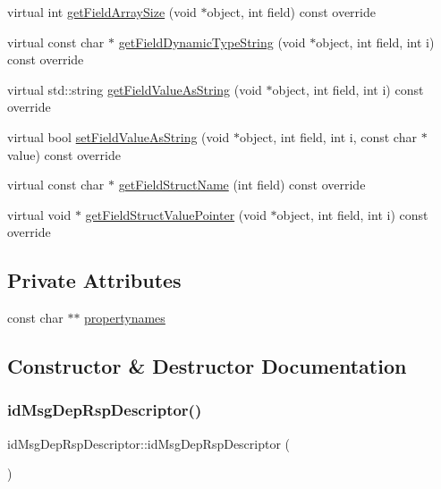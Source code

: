 \begin{DoxyCompactItemize}
virtual int \hyperlink{classidMsgDepRspDescriptor_a47159497c46236c093f395def9ea2601}{get\+Field\+Array\+Size} (void $\ast$object, int field) const override
\item 
virtual const char $\ast$ \hyperlink{classidMsgDepRspDescriptor_af4fdd8255c6294f4c68d7a8ce3cec648}{get\+Field\+Dynamic\+Type\+String} (void $\ast$object, int field, int i) const override
\item 
virtual std\+::string \hyperlink{classidMsgDepRspDescriptor_af28908b0998ae5028ce4439705a56bea}{get\+Field\+Value\+As\+String} (void $\ast$object, int field, int i) const override
\item 
virtual bool \hyperlink{classidMsgDepRspDescriptor_a3b2b332f7e3426e7b6464a973de48013}{set\+Field\+Value\+As\+String} (void $\ast$object, int field, int i, const char $\ast$value) const override
\item 
virtual const char $\ast$ \hyperlink{classidMsgDepRspDescriptor_a2c04a28f7d859199945889c5c1f1525f}{get\+Field\+Struct\+Name} (int field) const override
\item 
virtual void $\ast$ \hyperlink{classidMsgDepRspDescriptor_a1c3f7a29a3bd609bcb9da8317720f673}{get\+Field\+Struct\+Value\+Pointer} (void $\ast$object, int field, int i) const override
\end{DoxyCompactItemize}
\subsection*{Private Attributes}
\begin{DoxyCompactItemize}
\item 
const char $\ast$$\ast$ \hyperlink{classidMsgDepRspDescriptor_ab4be8a53831c1ebca93af83b99b3be40}{propertynames}
\end{DoxyCompactItemize}


\subsection{Constructor \& Destructor Documentation}
\mbox{\label{classidMsgDepRspDescriptor_abedc396206c401b49a270bdc1bce5005}} 
\subsubsection{\texorpdfstring{id\+Msg\+Dep\+Rsp\+Descriptor()}{idMsgDepRspDescriptor()}}
{\footnotesize\ttfamily id\+Msg\+Dep\+Rsp\+Descriptor\+::id\+Msg\+Dep\+Rsp\+Descriptor (\begin{DoxyParamCaption}{ }\end{DoxyParamCaption})}

